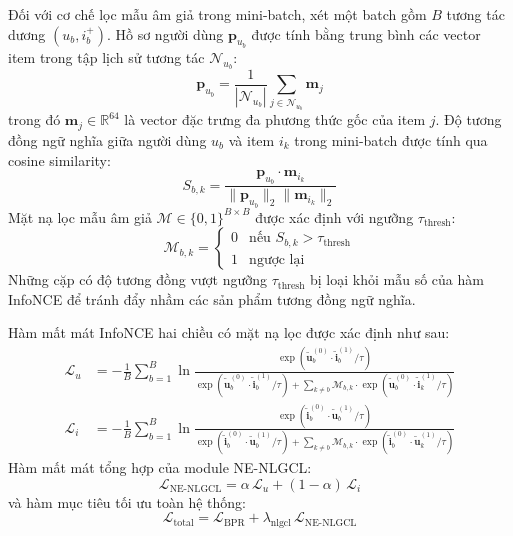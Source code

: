 Đối với cơ chế lọc mẫu âm giả trong mini-batch, xét một batch gồm $B$ tương tác dương $(u_b, i_b^+)$. Hồ sơ người dùng $\mathbf{p}_{u_b}$ được tính bằng trung bình các vector item trong tập lịch sử tương tác $\mathcal{N}_{u_b}$:
\begin{equation}
\mathbf{p}_{u_b} = \frac{1}{|\mathcal{N}_{u_b}|} \sum_{j \in \mathcal{N}_{u_b}} \mathbf{m}_j
\end{equation}
trong đó $\mathbf{m}_j \in \mathbb{R}^{64}$ là vector đặc trưng đa phương thức gốc của item $j$. Độ tương đồng ngữ nghĩa giữa người dùng $u_b$ và item $i_k$ trong mini-batch được tính qua cosine similarity:
\begin{equation}
S_{b, k} = \frac{\mathbf{p}_{u_b} \cdot \mathbf{m}_{i_k}}{\|\mathbf{p}_{u_b}\|_2 \|\mathbf{m}_{i_k}\|_2}
\end{equation}
Mặt nạ lọc mẫu âm giả $\mathcal{M} \in \{0, 1\}^{B \times B}$ được xác định với ngưỡng $\tau_{\text{thresh}}$:
\begin{equation}
\mathcal{M}_{b, k} = \begin{cases} 0 & \text{nếu } S_{b, k} > \tau_{\text{thresh}} \\ 1 & \text{ngược lại} \end{cases}
\end{equation}
Những cặp có độ tương đồng vượt ngưỡng $\tau_{\text{thresh}}$ bị loại khỏi mẫu số của hàm InfoNCE để tránh đẩy nhầm các sản phẩm tương đồng ngữ nghĩa.

Hàm mất mát InfoNCE hai chiều có mặt nạ lọc được xác định như sau:
\begin{align}
\mathcal{L}_u &= -\frac{1}{B} \sum_{b=1}^{B} \ln \frac{\exp\left(\tilde{\mathbf{u}}_b^{(0)} \cdot \tilde{\mathbf{i}}_b^{(1)} / \tau\right)}{\exp\left(\tilde{\mathbf{u}}_b^{(0)} \cdot \tilde{\mathbf{i}}_b^{(1)} / \tau\right) + \sum_{k \neq b} \mathcal{M}_{b, k} \cdot \exp\left(\tilde{\mathbf{u}}_b^{(0)} \cdot \tilde{\mathbf{i}}_k^{(1)} / \tau\right)} \\
\mathcal{L}_i &= -\frac{1}{B} \sum_{b=1}^{B} \ln \frac{\exp\left(\tilde{\mathbf{i}}_b^{(0)} \cdot \tilde{\mathbf{u}}_b^{(1)} / \tau\right)}{\exp\left(\tilde{\mathbf{i}}_b^{(0)} \cdot \tilde{\mathbf{u}}_b^{(1)} / \tau\right) + \sum_{k \neq b} \mathcal{M}_{b, k} \cdot \exp\left(\tilde{\mathbf{i}}_b^{(0)} \cdot \tilde{\mathbf{u}}_k^{(1)} / \tau\right)}
\end{align}
Hàm mất mát tổng hợp của module NE-NLGCL:
\begin{equation}
\mathcal{L}_{\text{NE-NLGCL}} = \alpha \, \mathcal{L}_u + (1 - \alpha) \, \mathcal{L}_i
\end{equation}
và hàm mục tiêu tối ưu toàn hệ thống:
\begin{equation}
\mathcal{L}_{\text{total}} = \mathcal{L}_{\text{BPR}} + \lambda_{\text{nlgcl}} \, \mathcal{L}_{\text{NE-NLGCL}}
\end{equation}

